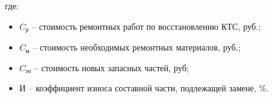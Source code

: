 %
\noindent где:
%
\begin{itemize}
%	
\item[ ]$C_\text {р} $ --  стоимость ремонтных работ по восстановлению КТС, руб.;
\item[ ]$ C_\text{м} $ --  стоимость необходимых ремонтных материалов, руб.;
\item[ ]$ C_\text{зч} $ --  стоимость новых запасных частей, руб;
\item[ ] $ \text{И} $ -- коэффициент износа составной части, подлежащей замене, \%.
\end{itemize}
%
\renewcommand\baselinestretch{1.2}\small\normalsize
%
%
%
%
